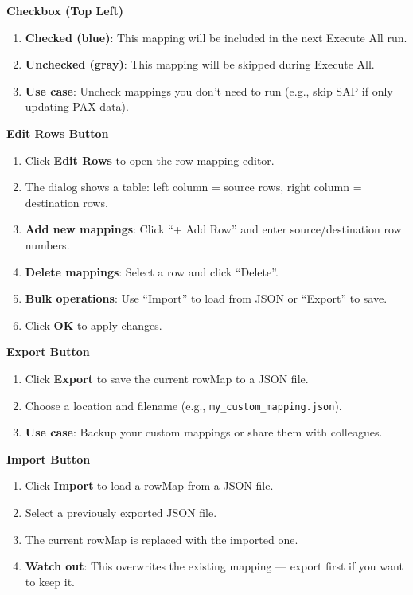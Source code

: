 \documentclass[11pt,a4paper]{article}
\begin{document}
\begin{stepbox}
\textbf{Checkbox (Top Left)}
\begin{enumerate}[leftmargin=*, itemsep=4pt]
\item \textbf{Checked (blue)}: This mapping will be included in the next Execute All run.
\item \textbf{Unchecked (gray)}: This mapping will be skipped during Execute All.
\item \textbf{Use case}: Uncheck mappings you don't need to run (e.g., skip SAP if only updating PAX data).
\end{enumerate}

\textbf{Edit Rows Button}
\begin{enumerate}[leftmargin=*, itemsep=4pt]
\item Click \textbf{Edit Rows} to open the row mapping editor.
\item The dialog shows a table: left column = source rows, right column = destination rows.
\item \textbf{Add new mappings}: Click ``+ Add Row'' and enter source/destination row numbers.
\item \textbf{Delete mappings}: Select a row and click ``Delete''.
\item \textbf{Bulk operations}: Use ``Import'' to load from JSON or ``Export'' to save.
\item Click \textbf{OK} to apply changes.
\end{enumerate}

\textbf{Export Button}
\begin{enumerate}[leftmargin=*, itemsep=4pt]
\item Click \textbf{Export} to save the current rowMap to a JSON file.
\item Choose a location and filename (e.g., \texttt{my\_custom\_mapping.json}).
\item \textbf{Use case}: Backup your custom mappings or share them with colleagues.
\end{enumerate}

\textbf{Import Button}
\begin{enumerate}[leftmargin=*, itemsep=4pt]
\item Click \textbf{Import} to load a rowMap from a JSON file.
\item Select a previously exported JSON file.
\item The current rowMap is replaced with the imported one.
\item \textbf{Watch out}: This overwrites the existing mapping --- export first if you want to keep it.
\end{enumerate}


\end{stepbox}
\end{document}
